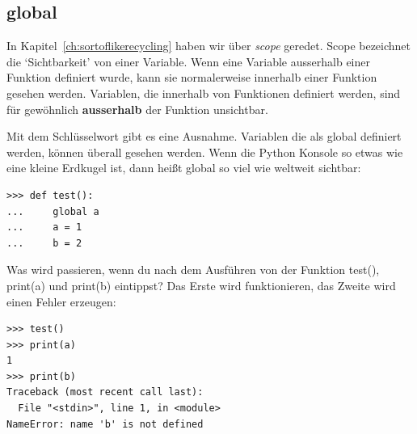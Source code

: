 \subsection*{global}

In Kapitel~\ref{ch:sortoflikerecycling} haben wir über \emph{scope} geredet. Scope bezeichnet die `Sichtbarkeit' von einer Variable. Wenn eine Variable ausserhalb einer Funktion definiert wurde, kann sie normalerweise innerhalb einer Funktion gesehen werden. Variablen, die innerhalb von Funktionen definiert werden, sind für gewöhnlich \textbf{ausserhalb} der Funktion unsichtbar.
\par
Mit dem  Schlüsselwort gibt es eine Ausnahme. Variablen die als global definiert werden, können überall gesehen werden. Wenn die Python Konsole so etwas wie eine kleine Erdkugel ist, dann heißt global so viel wie weltweit sichtbar:

\begin{Verbatim}[frame=single]
>>> def test():
...     global a
...     a = 1
...     b = 2
\end{Verbatim}

Was wird passieren, wenn du nach dem Ausführen von der Funktion test(), print(a) und print(b) eintippst? Das Erste wird funktionieren, das Zweite wird einen Fehler erzeugen:

\begin{Verbatim}[frame=single]
>>> test()
>>> print(a)
1
>>> print(b)
Traceback (most recent call last):
  File "<stdin>", line 1, in <module>
NameError: name 'b' is not defined
\end{Verbatim}

